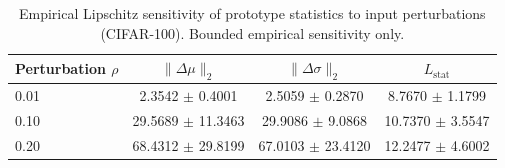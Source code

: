\begin{table}[t]
\centering
\caption{Empirical Lipschitz sensitivity of prototype statistics to input perturbations (CIFAR-100). Bounded empirical sensitivity only.}
\label{tab:lstat}
\begin{tabular}{lccc}
\toprule
Perturbation $\rho$ & $\|\Delta\mu\|_2$ & $\|\Delta\sigma\|_2$ & $L_{\mathrm{stat}}$ \\
\midrule
0.01 & 2.3542 $\pm$ 0.4001 & 2.5059 $\pm$ 0.2870 & 8.7670 $\pm$ 1.1799 \\
0.10 & 29.5689 $\pm$ 11.3463 & 29.9086 $\pm$ 9.0868 & 10.7370 $\pm$ 3.5547 \\
0.20 & 68.4312 $\pm$ 29.8199 & 67.0103 $\pm$ 23.4120 & 12.2477 $\pm$ 4.6002 \\
\bottomrule
\end{tabular}
\end{table}
